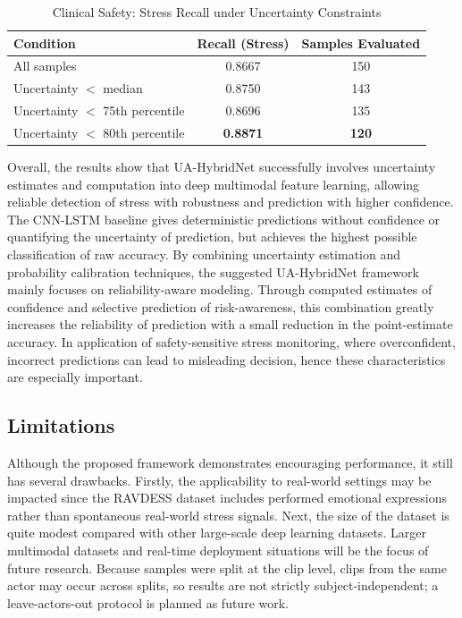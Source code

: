 \documentclass[conference]{IEEEtran}
\begin{document}
\begin{table}[H]
\centering
\caption{Clinical Safety: Stress Recall under Uncertainty Constraints}
\label{tab:clinical_safety}
\footnotesize
\setlength{\tabcolsep}{3pt}
\renewcommand{\arraystretch}{1.0}
\begin{tabular}{lcc}
\hline
Condition & Recall (Stress) & Samples Evaluated \\
\hline
All samples & 0.8667 & 150 \\
Uncertainty $<$ median & 0.8750 & 143 \\
Uncertainty $<$ 75th percentile & 0.8696 & 135 \\
Uncertainty $<$ 80th percentile & \textbf{0.8871} & \textbf{120} \\
\hline
\end{tabular}
\end{table}

Overall, the results show that UA-HybridNet successfully involves uncertainty estimates and computation into deep multimodal feature learning, allowing reliable detection of stress with robustness and prediction with higher confidence.
The CNN-LSTM baseline gives deterministic predictions without confidence or quantifying the uncertainty of prediction, but achieves the highest possible classification of raw accuracy. By combining uncertainty estimation and probability calibration techniques, the suggested UA-HybridNet framework mainly focuses on reliability-aware modeling.
Through computed estimates of confidence and selective prediction of risk-awareness, this combination greatly increases the reliability of prediction with a small reduction in the point-estimate accuracy.
In application of safety-sensitive stress monitoring, where overconfident, incorrect predictions can lead to misleading decision, hence these characteristics are especially important.

\subsection{Limitations}
Although the proposed framework demonstrates encouraging performance, it still has several drawbacks. 
Firstly, the applicability to real-world settings may be impacted since the RAVDESS dataset includes performed emotional expressions rather than spontaneous real-world stress signals. 
Next, the size of the dataset is quite modest compared with other large-scale deep learning datasets. Larger multimodal datasets and real-time deployment situations will be the focus of future research. Because samples were split at the clip level, clips from the same actor may occur across splits, so results are not strictly subject-independent; a leave-actors-out protocol is planned as future work.
\end{document}
